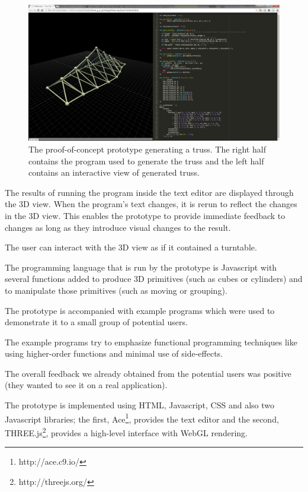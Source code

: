 \documentclass{./llncs2e/llncs}
\begin{document}
	\begin{figure}
	  \centering
	  \includegraphics[width=1.0\textwidth]{img/proto_3d_p_editor}
	    \caption{The proof-of-concept prototype generating a truss. The right half contains the program used to generate the truss and the left half contains an interactive view of generated truss.}
	  \label{fig:proto:3d:p:editor}
	\end{figure} 

	The results of running the program inside the text editor are displayed through the 3D view. 
	When the program's text changes, it is rerun to reflect the changes in the 3D view. 
	This enables the prototype to provide immediate feedback to changes as long as they introduce visual changes to the result.

	The user can interact with the 3D view as if it contained a turntable.

	The programming language that is run by the prototype is Javascript with several functions added to produce 3D primitives (such as cubes or cylinders) and to manipulate those primitives (such as moving or grouping).

	The prototype is accompanied with example programs which were used to demonstrate it to a small group of potential users.

	The example programs try to emphasize functional programming techniques like using higher-order functions and minimal use of side-effects.

	The overall feedback we already obtained from the potential users was positive (they wanted to see it on a real application).

	The prototype is implemented using HTML, Javascript, CSS and also two Javascript libraries; the first, Ace\footnote{http://ace.c9.io/}, provides the text editor and the second, THREE.js\footnote{http://threejs.org/}, provides a high-level interface with WebGL rendering.
\end{document}
